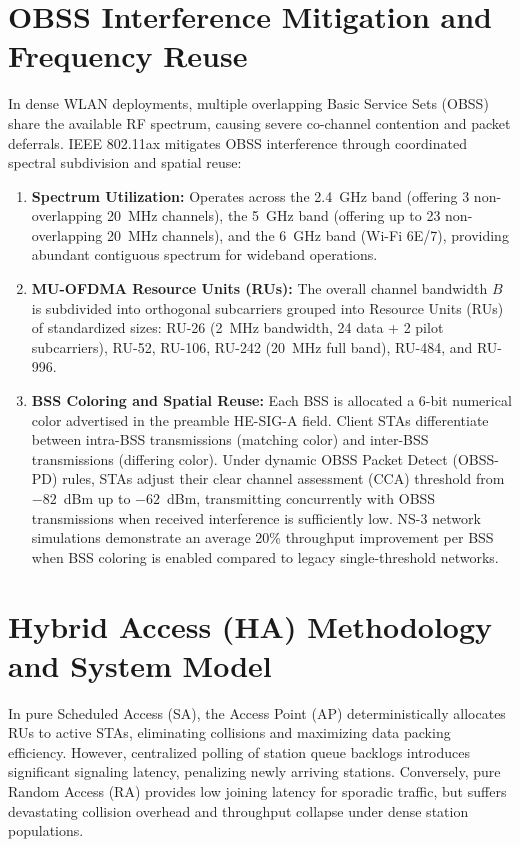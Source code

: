 \section{OBSS Interference Mitigation and Frequency Reuse}
In dense WLAN deployments, multiple overlapping Basic Service Sets (OBSS) share the available RF spectrum, causing severe co-channel contention and packet deferrals. IEEE 802.11ax mitigates OBSS interference through coordinated spectral subdivision and spatial reuse:
\begin{enumerate}
    \item \textbf{Spectrum Utilization:} Operates across the 2.4~GHz band (offering 3 non-overlapping 20~MHz channels), the 5~GHz band (offering up to 23 non-overlapping 20~MHz channels), and the 6~GHz band (Wi-Fi 6E/7), providing abundant contiguous spectrum for wideband operations.
    \item \textbf{MU-OFDMA Resource Units (RUs):} The overall channel bandwidth $B$ is subdivided into orthogonal subcarriers grouped into Resource Units (RUs) of standardized sizes: RU-26 (2~MHz bandwidth, 24 data + 2 pilot subcarriers), RU-52, RU-106, RU-242 (20~MHz full band), RU-484, and RU-996.
    \item \textbf{BSS Coloring and Spatial Reuse:} Each BSS is allocated a 6-bit numerical color advertised in the preamble HE-SIG-A field. Client STAs differentiate between intra-BSS transmissions (matching color) and inter-BSS transmissions (differing color). Under dynamic OBSS Packet Detect (OBSS-PD) rules, STAs adjust their clear channel assessment (CCA) threshold from $-82$~dBm up to $-62$~dBm, transmitting concurrently with OBSS transmissions when received interference is sufficiently low. NS-3 network simulations demonstrate an average 20\% throughput improvement per BSS when BSS coloring is enabled compared to legacy single-threshold networks.
\end{enumerate}

\section{Hybrid Access (HA) Methodology and System Model}
\label{sec:ha_proc}
In pure Scheduled Access (SA), the Access Point (AP) deterministically allocates RUs to active STAs, eliminating collisions and maximizing data packing efficiency. However, centralized polling of station queue backlogs introduces significant signaling latency, penalizing newly arriving stations. Conversely, pure Random Access (RA) provides low joining latency for sporadic traffic, but suffers devastating collision overhead and throughput collapse under dense station populations.

